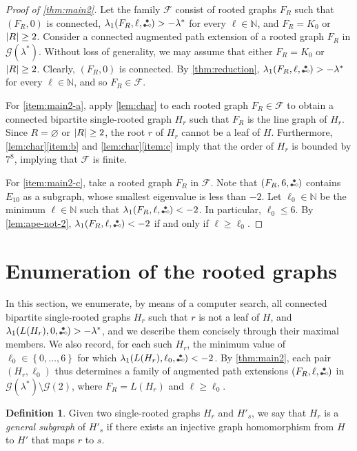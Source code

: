 \documentclass[11pt]{article}
\theoremstyle{definition}
\newtheorem{definition}[theorem]{Definition}
\theoremstyle{remark}
\DeclarePairedDelimiter\abs{\lvert}{\rvert}
\newcommand{\sset}[1]{\left\{{#1}\right\}}
\newcommand{\la}{\lambda}
\newcommand{\las}{\lambda^*}
\newcommand{\F}{\mathcal{F}}
\newcommand{\G}{\mathcal{G}}
\newcommand{\N}{\mathbb{N}}
\newcommand{\etwo}{\tikz[baseline=-0.2ex, scale=0.9]{\draw[darkgray, thick] (0,0)--(0.2,0); \draw[darkgray, fill=darkgray] (0,0) circle (0.05); \draw[darkgray, fill=darkgray] (0.1,0.17320508075) circle (0.05); \draw[darkgray, fill=white] (0.2,0) circle (0.05);}}
\newcommand{\ape}[1]{(#1,\etwo)}
\begin{document}
\begin{proof}[Proof of \cref{thm:main2}] \label{proof:main}
    Let the family $\F$ consist of rooted graphs $F_R$ such that $(F_R, 0)$ is connected, $\la_1\ape{F_R, \ell} > -\las$ for every $\ell \in \N$, and $F_R = K_0$ or $\abs{R} \ge 2$. Consider a connected augmented path extension of a rooted graph $F_R$ in $\G(\las)$. Without loss of generality, we may assume that either $F_R = K_0$ or $\abs{R} \ge 2$. Clearly, $(F_R, 0)$ is connected. By \cref{thm:reduction}, $\la_1\ape{F_R, \ell} > -\las$ for every $\ell \in \N$, and so $F_R \in \F$.

    For \ref{item:main2-a}, apply \cref{lem:char} to each rooted graph $F_R \in \F$ to obtain a connected bipartite single-rooted graph $H_r$ such that $F_R$ is the line graph of $H_r$. Since $R = \varnothing$ or $\abs{R} \ge 2$, the root $r$ of $H_r$ cannot be a leaf of $H$. Furthermore, \cref{lem:char}\ref{item:b} and \cref{lem:char}\ref{item:c} imply that the order of $H_r$ is bounded by $7^8$, implying that $\F$ is finite.

    For \ref{item:main2-c}, take a rooted graph $F_R$ in $\F$. Note that $\ape{F_R,6}$ contains $E_{10}$ as a subgraph, whose smallest eigenvalue is less than $-2$. Let $\ell_0 \in \N$ be the minimum $\ell \in \N$ such that $\la_1\ape{F_R,\ell} < -2$. In particular, $\ell_0 \le 6$. By \cref{lem:ape-not-2}, $\la_1\ape{F_R, \ell} < -2$ if and only if $\ell \ge \ell_0$.
\end{proof}

\section{Enumeration of the rooted graphs} \label{sec:enum}

In this section, we enumerate, by means of a computer search, all connected bipartite single-rooted graphs $H_r$ such that $r$ is not a leaf of $H$, and $\la_1\ape{L(H_r), 0} > -\las$, and we describe them concisely through their maximal members. We also record, for each such $H_r$, the minimum value of $\ell_0 \in \sset{0,\dots,6}$ for which $\la_1\ape{L(H_r),\ell_0} < -2$. By \cref{thm:main2}, each pair $(H_r, \ell_0)$ thus determines a family of augmented path extensions $\ape{F_R, \ell}$ in $\G(\las) \setminus \G(2)$, where $F_R = L(H_r)$ and $\ell \ge \ell_0$.

\begin{definition}
    Given two single-rooted graphs $H_r$ and $H'_s$, we say that $H_r$ is a \emph{general subgraph} of $H'_s$ if there exists an injective graph homomorphism from $H$ to $H'$ that maps $r$ to $s$.
\end{definition}
\end{document}
